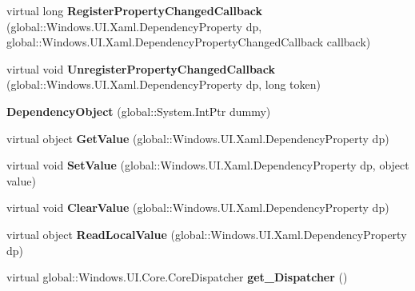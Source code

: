 \begin{DoxyCompactItemize}
virtual long {\bfseries Register\+Property\+Changed\+Callback} (global\+::\+Windows.\+U\+I.\+Xaml.\+Dependency\+Property dp, global\+::\+Windows.\+U\+I.\+Xaml.\+Dependency\+Property\+Changed\+Callback callback)
\item 
\mbox{\label{class_windows_1_1_u_i_1_1_xaml_1_1_dependency_object_a1038375289633f64b7f560eb26de036f}} 
virtual void {\bfseries Unregister\+Property\+Changed\+Callback} (global\+::\+Windows.\+U\+I.\+Xaml.\+Dependency\+Property dp, long token)
\item 
\mbox{\label{class_windows_1_1_u_i_1_1_xaml_1_1_dependency_object_a50ca400c3d5d8fb25c7f568083aab1b9}} 
{\bfseries Dependency\+Object} (global\+::\+System.\+Int\+Ptr dummy)
\item 
\mbox{\label{class_windows_1_1_u_i_1_1_xaml_1_1_dependency_object_ab7542d3826e3529750a867a66f41f33f}} 
virtual object {\bfseries Get\+Value} (global\+::\+Windows.\+U\+I.\+Xaml.\+Dependency\+Property dp)
\item 
\mbox{\label{class_windows_1_1_u_i_1_1_xaml_1_1_dependency_object_afbd5da79518b87e7eda7210ee248e8e2}} 
virtual void {\bfseries Set\+Value} (global\+::\+Windows.\+U\+I.\+Xaml.\+Dependency\+Property dp, object value)
\item 
\mbox{\label{class_windows_1_1_u_i_1_1_xaml_1_1_dependency_object_aae39f9b4dad56dfde575dd48bed82cd3}} 
virtual void {\bfseries Clear\+Value} (global\+::\+Windows.\+U\+I.\+Xaml.\+Dependency\+Property dp)
\item 
\mbox{\label{class_windows_1_1_u_i_1_1_xaml_1_1_dependency_object_adc36478eb501a1771f6d147333560730}} 
virtual object {\bfseries Read\+Local\+Value} (global\+::\+Windows.\+U\+I.\+Xaml.\+Dependency\+Property dp)
\item 
\mbox{\label{class_windows_1_1_u_i_1_1_xaml_1_1_dependency_object_a508c7b4f0ff4fbffc03e3c15071bccad}} 
virtual global\+::\+Windows.\+U\+I.\+Core.\+Core\+Dispatcher {\bfseries get\+\_\+\+Dispatcher} ()

\end{DoxyCompactItemize}
